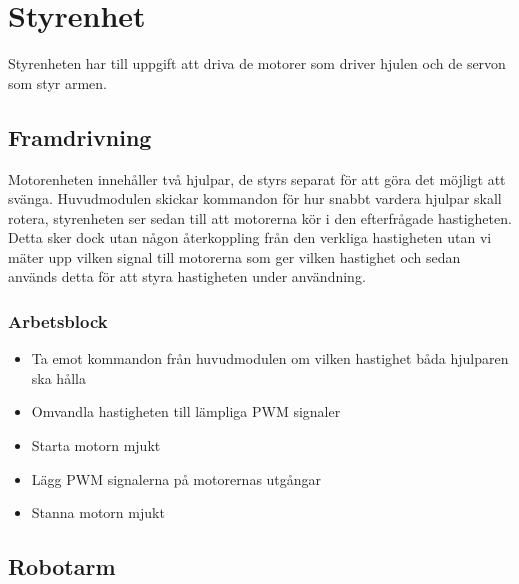 
\section{Styrenhet}

Styrenheten har till uppgift att driva de motorer som driver hjulen och de servon som styr armen.

\subsection{Framdrivning}

Motorenheten innehåller två hjulpar, de styrs separat för att göra det möjligt att svänga. Huvudmodulen skickar kommandon för hur snabbt vardera hjulpar skall rotera, styrenheten ser sedan till att motorerna kör i den efterfrågade hastigheten. Detta sker dock utan någon återkoppling från den verkliga hastigheten utan vi mäter upp vilken signal till motorerna som ger vilken hastighet och sedan används detta för att styra hastigheten under användning.

\subsubsection{Arbetsblock}
\begin{itemize}
\item Ta emot kommandon från huvudmodulen om vilken hastighet båda hjulparen ska hålla
\item Omvandla hastigheten till lämpliga PWM signaler
\item Starta motorn mjukt 
\item Lägg PWM signalerna på motorernas utgångar 
\item Stanna motorn mjukt
\end{itemize}

\subsection{Robotarm}


